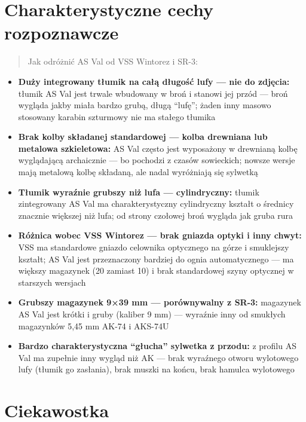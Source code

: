 \documentclass[12pt,openany,oneside]{book}
\providecommand{\tightlist}{%
  \setlength{\itemsep}{0pt}\setlength{\parskip}{0pt}}
\begin{document}
\section{Charakterystyczne cechy
rozpoznawcze}\label{charakterystyczne-cechy-rozpoznawcze-53}

\begin{quote}
Jak odróżnić AS Val od VSS Wintorez i SR-3:
\end{quote}

\begin{itemize}
\tightlist
\item
  \textbf{Duży integrowany tłumik na całą długość lufy --- nie do
  zdjęcia:} tłumik AS Val jest trwale wbudowany w broń i stanowi jej
  przód --- broń wygląda jakby miała bardzo grubą, długą ``lufę''; żaden
  inny masowo stosowany karabin szturmowy nie ma stałego tłumika
\item
  \textbf{Brak kolby składanej standardowej --- kolba drewniana lub
  metalowa szkieletowa:} AS Val często jest wyposażony w drewnianą kolbę
  wyglądającą archaicznie --- bo pochodzi z czasów sowieckich; nowsze
  wersje mają metalową kolbę składaną, ale nadal wyróżniają się sylwetką
\item
  \textbf{Tłumik wyraźnie grubszy niż lufa --- cylindryczny:} tłumik
  zintegrowany AS Val ma charakterystyczny cylindryczny kształt o
  średnicy znacznie większej niż lufa; od strony czołowej broń wygląda
  jak gruba rura
\item
  \textbf{Różnica wobec VSS Wintorez --- brak gniazda optyki i inny
  chwyt:} VSS ma standardowe gniazdo celownika optycznego na górze i
  smuklejszy kształt; AS Val jest przeznaczony bardziej do ognia
  automatycznego --- ma większy magazynek (20 zamiast 10) i brak
  standardowej szyny optycznej w starszych wersjach
\item
  \textbf{Grubszy magazynek 9×39 mm --- porównywalny z SR-3:} magazynek
  AS Val jest krótki i gruby (kaliber 9 mm) --- wyraźnie inny od
  smukłych magazynków 5,45 mm AK-74 i AKS-74U
\item
  \textbf{Bardzo charakterystyczna ``głucha'' sylwetka z przodu:} z
  profilu AS Val ma zupełnie inny wygląd niż AK --- brak wyraźnego
  otworu wylotowego lufy (tłumik go zasłania), brak muszki na końcu,
  brak hamulca wylotowego
\end{itemize}

\section{Ciekawostka}\label{ciekawostka-53}
\end{document}
